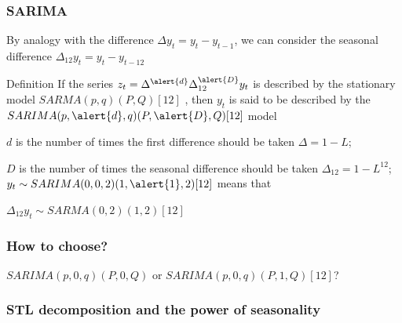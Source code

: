 \begin{frame}
	\frametitle{SARIMA}
	
	By analogy with the difference $\Delta y_t = y_t - y_{t-1}$, we can consider the seasonal difference $\Delta_{12} y_t = y_t - y_{t-12}$
	
	\pause
	\begin{block}{Definition}
		If the series $z_t = \Delta^{\alert{d}} \Delta^{\alert{D}}_{12} y_t$ is described by the stationary model $SARMA(p, q)(P, Q)[12]$ ,
		then $y_t$ is said to be described by the $SARIMA(p, \alert{d}, q)(P, \alert{D}, Q)[12]$ model
	\end{block}
	\pause
	$d$ is the number of times the first difference should be taken $\Delta = 1 - L$;
	
	$D$ is the number of times the seasonal  difference should be taken $\Delta_{12} = 1- L^{12}$;
	\pause
	$y_t \sim SARIMA(0, 0, 2)(1, \alert{1}, 2)[12]$ means that
	
	$\Delta_{12} y_t \sim SARMA(0, 2)(1, 2)[12]$
\end{frame}

\begin{frame}
	\frametitle{How to choose?}
	
	$SARIMA(p, 0, q)(P, 0, Q)$ or $SARIMA(p, 0, q)(P, 1, Q)[12]$?
	
	\begin{itemize}
				
		
		
		
	\end{itemize}
	
\end{frame}


\begin{frame}
	\frametitle{STL decomposition and the power of seasonality}
	
	
	
	
\end{frame}



